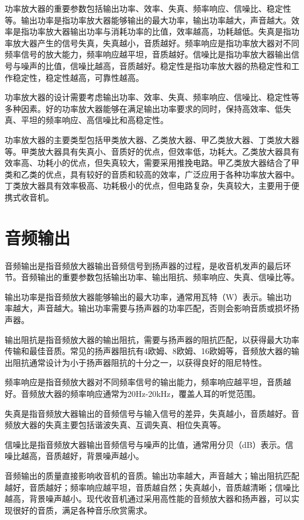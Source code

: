 \documentclass[12pt,UTF8]{ctexbook}
\begin{document}
功率放大器的重要参数包括输出功率、效率、失真、频率响应、信噪比、稳定性等。输出功率是指功率放大器能够输出的最大功率，输出功率越大，声音越大。效率是指功率放大器输出功率与消耗功率的比值，效率越高，功耗越低。失真是指功率放大器产生的信号失真，失真越小，音质越好。频率响应是指功率放大器对不同频率信号的放大能力，频率响应越平坦，音质越好。信噪比是指功率放大器输出信号与噪声的比值，信噪比越高，音质越好。稳定性是指功率放大器的热稳定性和工作稳定性，稳定性越高，可靠性越高。

功率放大器的设计需要考虑输出功率、效率、失真、频率响应、信噪比、稳定性等多种因素。好的功率放大器能够在满足输出功率要求的同时，保持高效率、低失真、平坦的频率响应、高信噪比和高稳定性。

功率放大器的主要类型包括甲类放大器、乙类放大器、甲乙类放大器、丁类放大器等。甲类放大器具有失真小、音质好的优点，但效率低，功耗大。乙类放大器具有效率高、功耗小的优点，但失真较大，需要采用推挽电路。甲乙类放大器结合了甲类和乙类的优点，具有较好的音质和较高的效率，广泛应用于各种功率放大器中。丁类放大器具有效率极高、功耗极小的优点，但电路复杂，失真较大，主要用于便携式收音机。

\section{音频输出}

音频输出是指音频放大器输出音频信号到扬声器的过程，是收音机发声的最后环节。音频输出的重要参数包括输出功率、输出阻抗、频率响应、失真、信噪比等。

输出功率是指音频放大器能够输出的最大功率，通常用瓦特（W）表示。输出功率越大，声音越大。输出功率需要与扬声器的功率匹配，否则会影响音质或损坏扬声器。

输出阻抗是指音频放大器的输出阻抗，需要与扬声器的阻抗匹配，以获得最大功率传输和最佳音质。常见的扬声器阻抗有4欧姆、8欧姆、16欧姆等，音频放大器的输出阻抗通常设计为小于扬声器阻抗的十分之一，以获得良好的阻尼特性。

频率响应是指音频放大器对不同频率信号的输出能力，频率响应越平坦，音质越好。音频放大器的频率响应通常为20Hz-20kHz，覆盖人耳的听觉范围。

失真是指音频放大器输出的音频信号与输入信号的差异，失真越小，音质越好。音频放大器的失真主要包括谐波失真、互调失真、相位失真等。

信噪比是指音频放大器输出音频信号与噪声的比值，通常用分贝（dB）表示。信噪比越高，音质越好，背景噪声越小。

音频输出的质量直接影响收音机的音质。输出功率越大，声音越大；输出阻抗匹配越好，音质越好；频率响应越平坦，音质越自然；失真越小，音质越清晰；信噪比越高，背景噪声越小。现代收音机通过采用高性能的音频放大器和扬声器，可以实现很好的音质，满足各种音乐欣赏需求。
\end{document}
